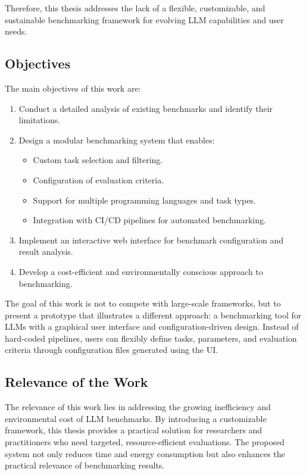 Therefore, this thesis addresses the lack of a flexible, customizable, and sustainable benchmarking framework for evolving LLM capabilities and user needs.

\subsection{Objectives}

The main objectives of this work are:
\begin{enumerate}
    \item Conduct a detailed analysis of existing benchmarks and identify their limitations.
    \item Design a modular benchmarking system that enables:
    \begin{itemize}
        \item Custom task selection and filtering.
        \item Configuration of evaluation criteria.
        \item Support for multiple programming languages and task types.
        \item Integration with CI/CD pipelines for automated benchmarking.
    \end{itemize}
    \item Implement an interactive web interface for benchmark configuration and result analysis.
    \item Develop a cost-efficient and environmentally conscious approach to benchmarking.
\end{enumerate}

The goal of this work is not to compete with large-scale frameworks, but to present a prototype that illustrates a different approach: a benchmarking tool for LLMs with a graphical user interface and configuration-driven design.
Instead of hard-coded pipelines, users can flexibly define tasks, parameters, and evaluation criteria through configuration files generated using the UI.

\subsection{Relevance of the Work}

The relevance of this work lies in addressing the growing inefficiency and environmental cost of LLM benchmarks.
By introducing a customizable framework, this thesis provides a practical solution for researchers and practitioners who need targeted, resource-efficient evaluations.
The proposed system not only reduces time and energy consumption but also enhances the practical relevance of benchmarking results.

